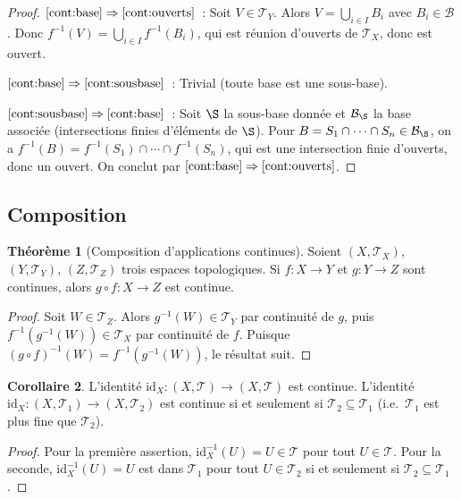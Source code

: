 \documentclass[12pt,a4paper,openany]{book}
\theoremstyle{definition}
\theoremstyle{cours}
\newtheorem{theoreme}{Théorème}[chapter]
\newtheorem{corollaire}[theoreme]{Corollaire}
\theoremstyle{coursnormal}
\newcommand{\T}{\mathcal{T}}
\newcommand{\B}{\mathcal{B}}
\begin{document}
\begin{proof}
  $\ref{cont:base}\Rightarrow\ref{cont:ouverts}$~: Soit $V\in\T_Y$. Alors
  $V=\bigcup_{i\in I} B_i$ avec $B_i\in\B$. Donc
  $f^{-1}(V) = \bigcup_{i\in I} f^{-1}(B_i)$, qui est réunion d'ouverts de
  $\T_X$, donc est ouvert.

  $\ref{cont:base}\Rightarrow\ref{cont:sousbase}$~: Trivial (toute base est
  une sous-base).

  $\ref{cont:sousbase}\Rightarrow\ref{cont:base}$~: Soit $\S$ la sous-base
  donnée et $\B_{\S}$ la base associée (intersections finies d'éléments de
  $\S$). Pour $B=S_1\cap\cdots\cap S_n\in\B_{\S}$, on a
  $f^{-1}(B) = f^{-1}(S_1)\cap\cdots\cap f^{-1}(S_n)$, qui est une
  intersection finie d'ouverts, donc un ouvert. On conclut par
  $\ref{cont:base}\Rightarrow\ref{cont:ouverts}$.
\end{proof}

\subsection{Composition}\label{subsec:composition-continuite}

\begin{theoreme}[Composition d'applications continues]\label{thm:composition-continue}
  Soient $(X,\T_X)$, $(Y,\T_Y)$, $(Z,\T_Z)$ trois espaces topologiques. Si
  $f\colon X\to Y$ et $g\colon Y\to Z$ sont continues, alors
  $g\circ f\colon X\to Z$ est
  continue.
\end{theoreme}

\begin{proof}
  Soit $W\in\T_Z$. Alors $g^{-1}(W)\in\T_Y$ par continuité de $g$, puis
  $f^{-1}(g^{-1}(W))\in\T_X$ par continuité de $f$. Puisque
  $(g\circ f)^{-1}(W) = f^{-1}(g^{-1}(W))$, le résultat suit.
\end{proof}

\begin{corollaire}\label{cor:cor:identite-continue}
  L'identité $\mathrm{id}_X\colon(X,\T)\to(X,\T)$ est continue. L'identité
  $\mathrm{id}_X\colon(X,\T_1)\to(X,\T_2)$ est continue si et seulement si
  $\T_2\subseteq\T_1$ (i.e.\ $\T_1$ est plus fine que $\T_2$).
\end{corollaire}

\begin{proof}
  Pour la première assertion, $\mathrm{id}_X^{-1}(U)=U\in\T$ pour tout
  $U\in\T$. Pour la seconde, $\mathrm{id}_X^{-1}(U)=U$ est dans $\T_1$
  pour tout $U\in\T_2$ si et seulement si $\T_2\subseteq\T_1$.
\end{proof}
\end{document}

